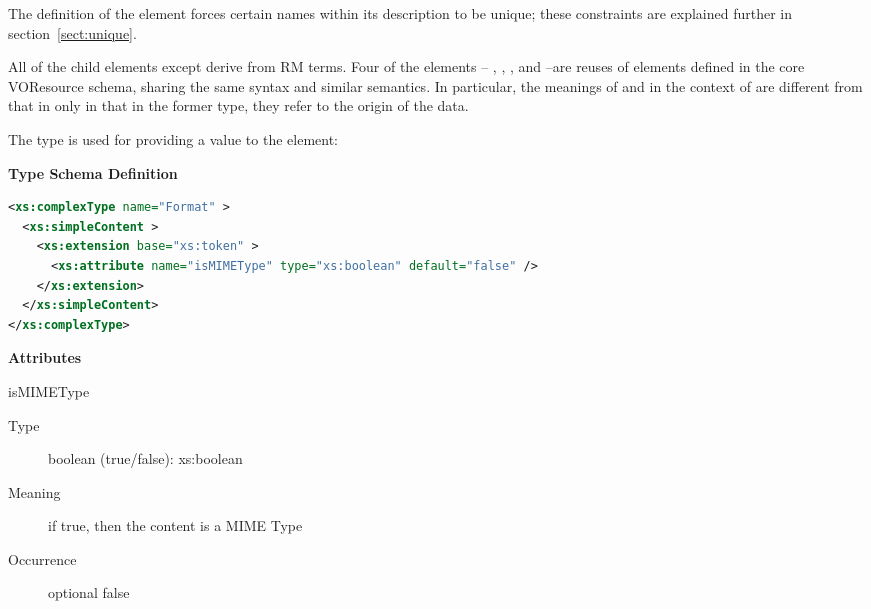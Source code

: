 \documentclass[11pt,a4paper]{ivoa}
\begin{document}

The definition of the  element forces certain
names within its description to be unique; these constraints are explained
further in section~\ref{sect:unique}.



All of the child elements except  derive
from RM terms.  Four of the elements -- , 
, ,
and --are reuses of elements defined in 
the core VOResource schema, sharing the same syntax and similar
semantics.  In particular, the meanings of 
and  in the context of 
 are different from that in 
 only in that in the former type, they refer
to the origin of the data.  



The  type is used for
providing a value to the  element:


\begin{generated}
\begingroup
      	\renewcommand*\descriptionlabel[1]{%
      	\hbox to 5.5em{\emph{#1}\hfil}}\vspace{1ex}\noindent\textbf{ Type Schema Definition}

\begin{lstlisting}[language=XML,basicstyle=\footnotesize]
<xs:complexType name="Format" >
  <xs:simpleContent >
    <xs:extension base="xs:token" >
      <xs:attribute name="isMIMEType" type="xs:boolean" default="false" />
    </xs:extension>
  </xs:simpleContent>
</xs:complexType>
\end{lstlisting}

\vspace{0.5ex}\noindent\textbf{ Attributes}

\begingroup\small\begin{bigdescription}
\item[isMIMEType]
\begin{description}
\item[Type] boolean (true/false): xs:boolean
\item[Meaning] 
                 if true, then the content is a MIME Type
               
\item[Occurrence] optional
false
\end{description}


\end{bigdescription}\endgroup

\endgroup
\end{generated}
\end{document}

